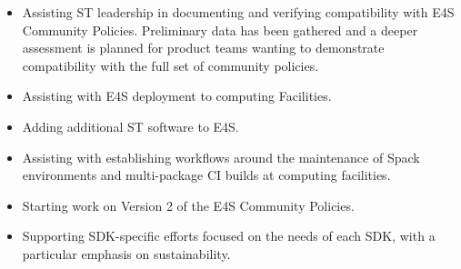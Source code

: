 \begin{itemize}
\item  Assisting ST leadership in documenting and verifying compatibility with E4S Community Policies. Preliminary data has been gathered and a deeper assessment is planned for product teams wanting to demonstrate compatibility with the full set of community policies.
\item  Assisting with E4S deployment to computing Facilities.
\item  Adding additional ST software to E4S.
\item  Assisting with establishing workflows around the maintenance of Spack environments and multi-package CI builds at computing facilities.
\item  Starting work on Version 2 of the E4S Community Policies.
\item  Supporting SDK-specific efforts focused on the needs of each SDK, with a particular emphasis on sustainability.
\end{itemize}

